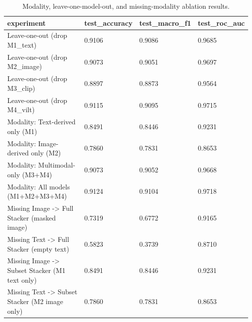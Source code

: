 \begin{table}[t]
\centering
\caption{Modality, leave-one-model-out, and missing-modality ablation results.}
\label{tab:e4_ablation}
\begin{tabular}{llll}
\toprule
experiment & test\_accuracy & test\_macro\_f1 & test\_roc\_auc \\
\midrule
Leave-one-out (drop M1\_text) & 0.9106 & 0.9086 & 0.9685 \\
Leave-one-out (drop M2\_image) & 0.9073 & 0.9051 & 0.9697 \\
Leave-one-out (drop M3\_clip) & 0.8897 & 0.8873 & 0.9564 \\
Leave-one-out (drop M4\_vilt) & 0.9115 & 0.9095 & 0.9715 \\
Modality: Text-derived only (M1) & 0.8491 & 0.8446 & 0.9231 \\
Modality: Image-derived only (M2) & 0.7860 & 0.7831 & 0.8653 \\
Modality: Multimodal-only (M3+M4) & 0.9073 & 0.9052 & 0.9668 \\
Modality: All models (M1+M2+M3+M4) & 0.9124 & 0.9104 & 0.9718 \\
Missing Image -> Full Stacker (masked image) & 0.7319 & 0.6772 & 0.9165 \\
Missing Text -> Full Stacker (empty text) & 0.5823 & 0.3739 & 0.8710 \\
Missing Image -> Subset Stacker (M1 text only) & 0.8491 & 0.8446 & 0.9231 \\
Missing Text -> Subset Stacker (M2 image only) & 0.7860 & 0.7831 & 0.8653 \\
\bottomrule
\end{tabular}
\end{table}
